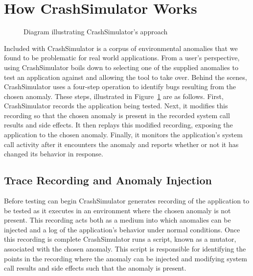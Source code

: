 \section{How CrashSimulator Works}
\label{SEC:approach}

\begin{figure}[t]
  \center{}
  \caption{Diagram illustrating CrashSimulator's approach}
  \label{figure:approach}
\end{figure}

Included with CrashSimulator is a corpus of environmental anomalies
that we found to be problematic for real world
applications.
From a user's perspective, using CrashSimulator boils down to selecting one
of the supplied anomalies to test an application against and allowing the
tool to take over.  Behind the scenes,
CrashSimulator uses a four-step operation to identify bugs resulting from
the chosen anomaly.
These steps, illustrated in Figure~\ref{figure:approach} are as follows.
First, CrashSimulator records the application being tested.  Next, it
modifies this recording so that the chosen anomaly is present in the
recorded system call results and side effects.  It then replays this
modified recording, exposing the application to the chosen anomaly.
Finally, it monitors the application's system call activity after it
encounters the anomaly and reports whether or not it has changed its
behavior in response.

\subsection{Trace Recording and Anomaly Injection}

Before testing can begin
CrashSimulator generates recording of the application to be
tested as it executes in an environment where the chosen anomaly is not
present.  This recording acts both as a medium into which anomalies can be
injected and a log of the application's behavior under normal
conditions.  Once this recording is complete CrashSimulator runs a script,
known as a mutator, associated with the chosen anomaly.
This script is responsible for identifying
the points in the recording
where the anomaly can be injected and modifying
system call results and side effects such that the anomaly is present.

